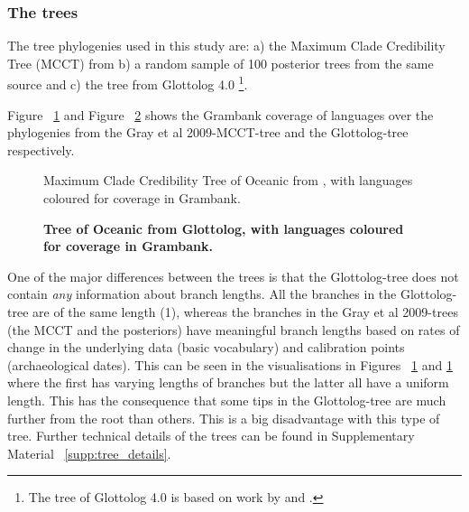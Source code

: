 \documentclass[a4paper,10pt]{article} %
\begin{document}
\subsubsection{The trees}
The tree phylogenies used in this study are: a) the Maximum Clade Credibility Tree (MCCT) from \citet{grayetal_2009} b) a random sample of 100 posterior trees from the same source and c) the tree from Glottolog 4.0 \footnote{The tree of Glottolog 4.0 \citep{glottolog40} is based on work by \citet{blust_2009, blust_2014} and \citet{blust_chen_2017}.}. 

Figure ~\ref{tree_coverage_oceanic_gray} and Figure ~\ref{tree_coverage_oceanic_glottolog} shows the Grambank coverage of languages over the phylogenies from the Gray et al 2009-MCCT-tree and the Glottolog-tree respectively. 

\begin{figure}[H]
\centering
\caption{{Maximum Clade Credibility Tree of Oceanic from \citet{grayetal_2009}, with languages coloured for coverage in Grambank.}}
\label{tree_coverage_oceanic_gray}
\end{figure}

\begin{figure}[H]
\centering
\caption{\textbf{Tree of Oceanic from Glottolog, with languages coloured for coverage in Grambank.}}
\label{tree_coverage_oceanic_glottolog}
\end{figure}

One of the major differences between the trees is that the Glottolog-tree does not contain \emph{any} information about branch lengths. All the branches in the Glottolog-tree are of the same length (1), whereas the branches in the Gray et al 2009-trees (the MCCT and the posteriors) have meaningful branch lengths based on rates of change in the underlying data (basic vocabulary) and calibration points (archaeological dates). This can be seen in the visualisations in Figures ~\ref{tree_coverage_oceanic_gray} and \ref{tree_coverage_oceanic_gray} where the first has varying lengths of branches but the latter all have a uniform length. This has the consequence that some tips in the Glottolog-tree are much further from the root than others. This is a big disadvantage with this type of tree. Further technical details of the trees can be found in Supplementary Material ~\ref{supp:tree_details}.
\end{document}
